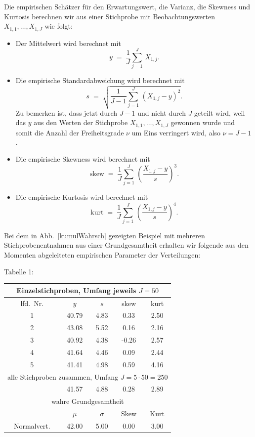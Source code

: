 Die empirischen Schätzer für den Erwartungswert, die Varianz, die Skewness und Kurtosis
berechnen wir aus einer Stichprobe mit Beobachtungswerten $X_{1,1}, \dots, X_{1,J}$
wie folgt:
\begin{itemize}
\item[] Der Mittelwert wird berechnet mit
\begin{equation}
y \; = \; \frac{1}{J}\sum_{j=1}^J \, X_{1,j} .
\end{equation}
\item[] Die empirische Standardabweichung wird berechnet mit
\begin{equation}
s \; = \; \sqrt{ \frac{1}{J-1}\sum_{j=1}^J \, (X_{1,j} - y)^2 }.
\label{empirischeStd}
\end{equation}
Zu bemerken ist, dass jetzt durch $J-1$ und nicht durch $J$ geteilt wird, weil
das $y$ aus den Werten der Stichprobe $X_{1,1}, \dots, X_{1,J}$ gewonnen wurde und somit
die Anzahl der Freiheitsgrade $\nu$ um Eins verringert wird, also $\nu = J-1$.
\item[]
Die empirische Skewness wird berechnet mit
\begin{equation}
\textrm{skew} \; = \; \frac{1}{J} \sum_{j=1}^J \, \left( \frac{X_{1,j} - y}{s} \right)^3 .
\end{equation}
\item[] Die empirische Kurtosis wird berechnet mit
\begin{equation}
\textrm{kurt} \; = \; \frac{1}{J} \sum_{j=1}^J \, \left( \frac{X_{1,j} - y}{s} \right)^4 .
\end{equation}
\end{itemize}
Bei dem in Abb.~\ref{kumulWahrsch} gezeigten Beispiel mit mehreren Stichprobenentnahmen aus
einer Grundgesamtheit erhalten wir folgende aus den Momenten abgeleiteten empirischen
Parameter der Verteilungen:
\begin{center}
Tabelle 1:

\begin{tabular}{c||c|c|c|c}
\hline
\multicolumn{5}{c}{Einzelstichproben, Umfang jeweils $J = 50$}\\
\hline
lfd.\ Nr. & $y$ & $s$ & skew & kurt\\
\hline\hline
1 & 40.79 &  4.83 &  0.33 &  2.50 \\
2 & 43.08 &  5.52 &  0.16 &  2.16 \\
3 & 40.92 &  4.38 & -0.26 &  2.57 \\
4 & 41.64 &  4.46 &  0.09 &  2.44 \\
5 & 41.41 &  4.98 &  0.59 &  4.16 \\
\hline\hline
\multicolumn{5}{c}{alle Stichproben zusammen, Umfang $J = 5 \cdot 50 = 250$}\\
\hline
 & 41.57 &  4.88 &  0.28 &  2.89 \\
\hline\hline
\multicolumn{5}{c}{wahre Grundgesamtheit}\\
\hline
 & $\mu$ & $\sigma$ & Skew & Kurt\\
\hline\hline
Normalvert. & 42.00 &  5.00 &  0.00 &  3.00 \\
\hline
\end{tabular}
\end{center}

